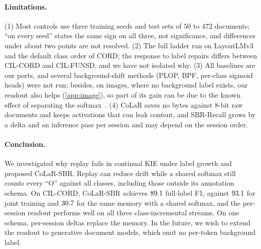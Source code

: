 \documentclass[10pt,twocolumn,letterpaper]{article}
\begin{document}
\paragraph{Limitations.} (1) Most controls use three training seeds and test sets of $50$ to $472$ documents; ``on every seed'' states the same sign on all three, not significance, and differences under about two points are not resolved. (2) The full ladder ran on LayoutLMv3 and the default class order of CORD; the response to label repairs differs between CIL-CORD and CIL-FUNSD, and we have not isolated why. (3) All baselines are our ports, and several background-shift methods (PLOP, BPF, per-class sigmoid heads) were not run; besides, on images, where no background label exists, our readout also helps (\cref{app:image}), so part of its gain can be due to the known effect of separating the softmax~\citep{ahn2021ssil}. (4) CoLaR saves no bytes against 8-bit raw documents and keeps activations that can leak content, and SBR-Recall grows by a delta and an inference pass per session and may depend on the session order.

\paragraph{Conclusion.} We investigated why replay fails in continual KIE under label growth and proposed CoLaR-SBR. Replay can reduce drift while a shared softmax still counts every ``O'' against all classes, including those outside its annotation schema. On CIL-CORD, CoLaR-SBR achieves $89.1$ full-label F1, against $93.1$ for joint training and $30.7$ for the same memory with a shared softmax, and the per-session readout performs well on all three class-incremental streams. On one schema, per-session deltas replace the memory. In the future, we wish to extend the readout to generative document models, which emit no per-token background label.\label{mainend}%
\end{document}

